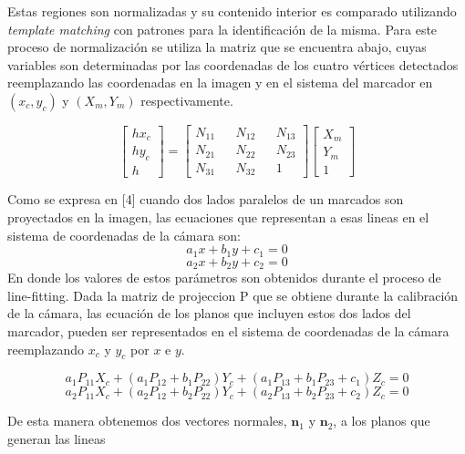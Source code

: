 \documentclass[runningheads]{llncs}
\begin{document}
Estas regiones son normalizadas y su contenido interior es comparado utilizando \textit{template matching} con patrones para la identificación de la misma. Para este proceso de normalización se utiliza la matriz que se encuentra abajo, cuyas variables son determinadas por las coordenadas de los cuatro vértices detectados reemplazando las coordenadas en la imagen y en el sistema del marcador en $(x_{c},y_{c})$ y $(X_m,Y_m)$ respectivamente.

\[
\begin{bmatrix}
hx_{c} \\
hy_{c} \\
h 
\end{bmatrix} =
\begin{bmatrix}
N_{11} && N_{12} && N_{13}\\ 
N_{21} && N_{22} && N_{23}\\
N_{31} && N_{32} && 1
\end{bmatrix} 
\begin{bmatrix}
X_{m} \\
Y_{m} \\
1
\end{bmatrix}
\]

Como se expresa en [4] cuando dos lados paralelos de un marcados son proyectados en la imagen, las ecuaciones que representan a esas lineas en el sistema de coordenadas de la cámara son:
\begin{equation}
a_{1}x+b_1y + c_1 = 0
\end{equation}
\begin{equation}
a_{2}x+b_2y + c_2 = 0
\end{equation}
En donde los valores de estos parámetros son obtenidos durante el proceso de line-fitting. Dada la matriz de projeccion P que se obtiene durante la calibración de la cámara, las ecuación de los planos que incluyen estos dos lados del marcador, pueden ser representados en el sistema de coordenadas de la cámara reemplazando $x_c$ y $y_c$ por $x$ e $y$.

\begin{equation}
a_1P_{11}X_c + (a_1P_{12}+ b_1P_{22})Y_c + (a_1P_{13}+ b_1P_{23}+ c_1)Z_c = 0
\end{equation}
\begin{equation}
a_2P_{11}X_c + (a_2P_{12}+ b_2P_{22})Y_c + (a_2P_{13}+ b_2P_{23}+ c_2)Z_c = 0
\end{equation}

De esta manera obtenemos dos vectores normales, $ \textbf{n}_{1} $ y $ \textbf{n}_{2} $, a los planos que generan las lineas
\end{document}
